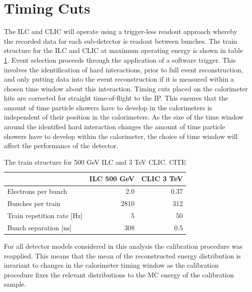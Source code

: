 
\section{Timing Cuts}
The ILC and CLIC will operate using a trigger-less readout approach whereby the recorded data for each sub-detector is readout between bunches.  The train structure for the ILC and CLIC at maximum operating energy is shown in table \ref{table:trainstructure}.  Event selection proceeds through the application of a software trigger.  This involves the identification of hard interactions, prior to full event reconstruction, and only putting data into the event reconstruction if it is measured within a chosen time window about this interaction.  Timing cuts placed on the calorimeter hits are corrected for straight time-of-flight to the IP.  This ensures that the amount of time particle showers have to develop in the calorimeters is independent of their position in the calorimeters.  As the size of the time window around the identified hard interaction changes the amount of time particle showers have to develop within the calorimeter, the choice of time window will affect the performance of the detector. 

\begin{table}[h!]
\centering
\begin{tabular}{l r r}
\hline
& ILC 500 GeV & CLIC 3 TeV \\
\hline
Electrons per bunch & 2.0 & 0.37 \\
Bunches per train & 2810 & 312 \\
Train repetition rate [Hz] & 5 & 50 \\
Bunch separation [ns] & 308 & 0.5 \\
\end{tabular}
\caption[The train structure for 500 GeV ILC and 3 TeV CLIC.]{The train structure for 500 GeV ILC and 3 TeV CLIC.  CITE}
\label{table:trainstructure}
\end{table}

For all detector models considered in this analysis the calibration procedure was reapplied.  This means that the mean of the reconstructed energy distribution is invariant to changes in the calorimeter timing window as the calibration procedure fixes the relevant distributions to the MC energy of the calibration sample.  

